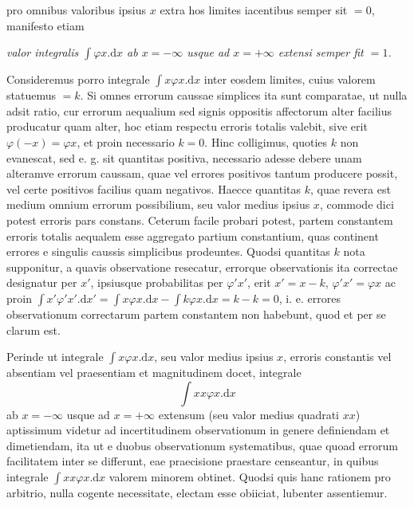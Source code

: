pro omnibus valoribus ipsius \(x\) extra hos limites iacentibus semper sit \(=0\), manifesto etiam

\textit{valor integralis \(\int\varphi x.\mathrm{d}x\) ab \(x=-\infty\) usque ad \(x=+\infty\) extensi semper fit \(=1\).}

Consideremus porro integrale \(\int x\varphi x.\mathrm{d}x\) inter eosdem limites, cuius valorem statuemus \(=k\). Si omnes errorum caussae simplices ita sunt comparatae, ut nulla adsit ratio, cur errorum aequalium sed signis oppositis affectorum alter facilius producatur quam alter, hoc etiam respectu erroris totalis valebit, sive erit \(\varphi(-x)=\varphi x\), et proin necessario \(k=0\). Hinc colligimus, quoties \(k\) non evanescat, sed e. g. sit quantitas positiva, necessario adesse debere unam alteramve errorum caussam, quae vel errores positivos tantum producere possit, vel certe positivos facilius quam negativos. Haecce quantitas \(k\), quae revera est medium omnium errorum possibilium, seu valor medius ipsius \(x\), commode dici potest erroris pars constans. Ceterum facile probari potest, partem constantem erroris totalis aequalem esse aggregato partium constantium, quas continent errores e singulis caussis simplicibus prodeuntes. Quodsi quantitas \(k\) nota supponitur, a quavis observatione resecatur, errorque observationis ita correctae designatur per \(x'\), ipsiusque probabilitas per \(\varphi' x'\), erit \(x'=x-k\), \(\varphi' x'=\varphi x\) ac proin \(\int x'\varphi' x'.\mathrm{d}x'=\int x\varphi x.\mathrm{d}x-\int k\varphi x.\mathrm{d}x=k-k=0\), i. e. errores observationum correctarum partem constantem non habebunt, quod et per se clarum est.

Perinde ut integrale \(\int x\varphi x.\mathrm{d}x\), seu valor medius ipsius \(x\), erroris constantis vel absentiam vel praesentiam et magnitudinem docet, integrale
\[
\int xx\varphi x.\mathrm{d}x
\]
ab \(x=-\infty\) usque ad \(x=+\infty\) extensum (seu valor medius quadrati \(xx\)) aptissimum videtur ad incertitudinem observationum in genere definiendam et dimetiendam, ita ut e duobus observationum systematibus, quae quoad errorum facilitatem inter se differunt, eae praecisione praestare censeantur, in quibus integrale \(\int xx\varphi x.\mathrm{d}x\) valorem minorem obtinet. Quodsi quis hanc rationem pro arbitrio, nulla cogente necessitate, electam esse obiiciat, lubenter assentiemur.
